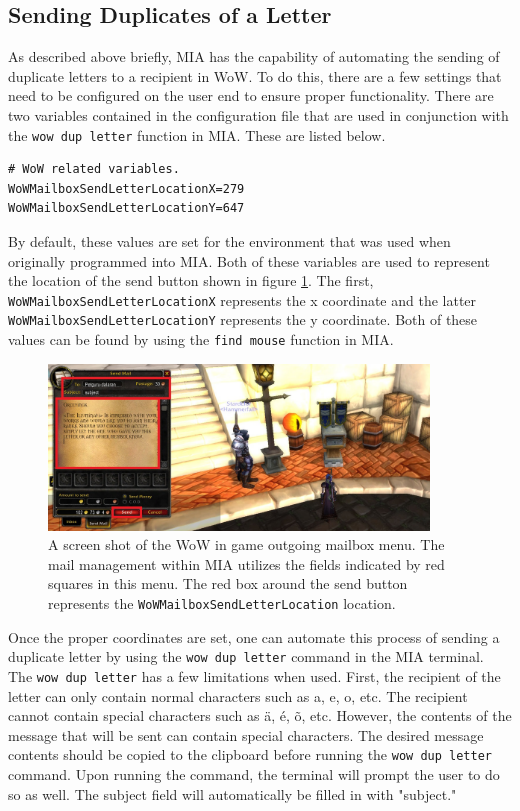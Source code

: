 \subsection{Sending Duplicates of a Letter}

As described above briefly, MIA has the capability of automating the sending of duplicate letters to a recipient in WoW. To do this, there are a few settings that need to be configured on the user end to ensure proper functionality. There are two variables contained in the configuration file that are used in conjunction with the \texttt{wow dup letter} function in MIA. These are listed below.

\begin{lstlisting}
# WoW related variables.
WoWMailboxSendLetterLocationX=279
WoWMailboxSendLetterLocationY=647
\end{lstlisting}

By default, these values are set for the environment that was used when originally programmed into MIA. Both of these variables are used to represent the location of the send button shown in figure \ref{wow mailbox send}. The first, \texttt{WoWMailboxSendLetterLocationX} represents the x coordinate and the latter \texttt{WoWMailboxSendLetterLocationY} represents the y coordinate. Both of these values can be found by using the \texttt{find mouse} function in MIA. 

\begin{figure}[h]
	\centering
	\includegraphics[width=0.9\textwidth]{images/WoWScrnShot_040518_181350b.jpg}
	\caption{A screen shot of the WoW in game outgoing mailbox menu. The mail management within MIA utilizes the fields indicated by red squares in this menu. The red box around the send button represents the \texttt{WoWMailboxSendLetterLocation} location.} \label{wow mailbox send}
\end{figure}

Once the proper coordinates are set, one can automate this process of sending a duplicate letter by using the \texttt{wow dup letter} command in the MIA terminal. The \texttt{wow dup letter} has a few limitations when used. First, the recipient of the letter can only contain normal characters such as a, e, o, etc. The recipient cannot contain special characters such as \"{a}, \'{e}, \~{o}, etc. However, the contents of the message that will be sent can contain special characters. The desired message contents should be copied to the clipboard before running the \texttt{wow dup letter} command. Upon running the command, the terminal will prompt the user to do so as well. The subject field will automatically be filled in with "subject."

